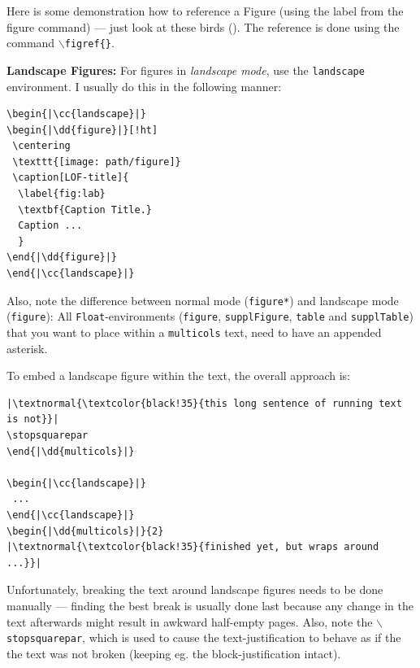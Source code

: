 \begin{multicols}{2}
Here is some demonstration how to reference a Figure (using the label from the figure command) --- just look at these birds ().
The reference is done using the command \texttt{$\backslash$figref\{\}}.

\textbf{Landscape Figures:} For figures in \textit{landscape mode}, use the \texttt{landscape} environment.
I usually do this in the following manner:

\begin{tcolorbox}[arc=0pt,outer arc=0pt,breakable,colback=black!05,colframe=black!10,pad at break=2mm,boxrule=0.1pt]
\begin{lstlisting}
\begin{|\cc{landscape}|}
\begin{|\dd{figure}|}[!ht]
 \centering
 \texttt{[image: path/figure]}
 \caption[LOF-title]{
  \label{fig:lab}
  \textbf{Caption Title.}
  Caption ...
  }
\end{|\dd{figure}|}
\end{|\cc{landscape}|}
\end{lstlisting}
\end{tcolorbox}

Also, note the difference between normal mode (\texttt{figure*}) and landscape mode (\texttt{figure}):
All \texttt{Float}-environments (\texttt{figure}, \texttt{supplFigure}, \texttt{table} and \texttt{supplTable}) that you want to place within a \texttt{multicols} text, need to have an  appended asterisk.

To embed a landscape figure within the text, the overall approach is:

\begin{tcolorbox}[arc=0pt,outer arc=0pt,breakable,colback=black!05,colframe=black!10,pad at break=2mm,boxrule=0.1pt]
\begin{lstlisting}
|\textnormal{\textcolor{black!35}{this long sentence of running text is not}}|
\stopsquarepar
\end{|\dd{multicols}|}

\begin{|\cc{landscape}|}
 ...
\end{|\cc{landscape}|}
\begin{|\dd{multicols}|}{2}
|\textnormal{\textcolor{black!35}{finished yet, but wraps around ...}}|
\end{lstlisting}
\end{tcolorbox}

Unfortunately, breaking the text around landscape figures needs to be done manually --- finding the best break is usually done last because any change in the text afterwards might result in awkward half-empty pages.
Also, note the \texttt{$\backslash$stopsquarepar}, which is used to cause the text-justification to behave as if the the text was not broken (keeping eg. the block-justification intact).


\end{multicols}
